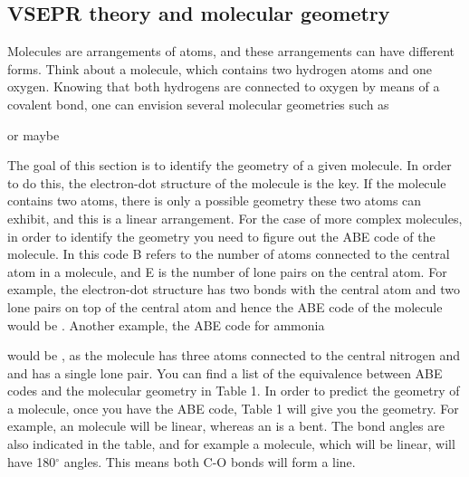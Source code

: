 \documentclass[cover.tex]{subfiles}
\begin{document}
\begin{refsection}
\subsection*{VSEPR theory and molecular geometry}
Molecules are arrangements of atoms, and these arrangements can have different forms. Think about a  molecule, which contains two hydrogen atoms and one oxygen. Knowing that both hydrogens are connected to oxygen by means of a covalent bond, one can envision several molecular geometries such as 
\begin{center}
\hspace{.05in} or \hspace{1cm} maybe \hspace{1cm} 
\end{center} 
The goal of this section is to identify the geometry of a given molecule. In order to do this, the electron-dot structure of the molecule is the key. If the molecule contains two atoms, there is only a possible geometry these two atoms can exhibit, and this is a linear arrangement. For the case of more complex molecules, in order to identify the geometry you need to figure out the ABE code of the molecule. In this code B refers to the number of atoms connected to the central atom in a molecule, and E is the number of lone pairs on the central atom. For example, the electron-dot \hspace{.05in}\hspace{.05in} structure has two bonds with the central atom  and two lone pairs on top of the central atom  and hence the ABE code of the molecule would be . Another example, the ABE code for  ammonia  \begin{center}  \end{center}  
would be , as the molecule has three atoms connected to the central nitrogen and and  has a single lone pair. You can find a list of the equivalence between ABE codes and the molecular geometry in Table 1. In order to predict the geometry of a molecule, once you have the ABE code, Table 1 will give you the geometry. For example, an  molecule will be linear, whereas an  is a bent. The bond angles are also indicated in the table, and for example a  molecule, which will be linear, will have 180$^{\circ}$ angles. This means both C-O bonds will form a line.


\end{refsection}
\end{document}
